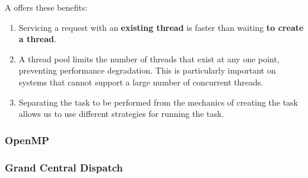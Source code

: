 A  offers these benefits:
\begin{enumerate}[noitemsep]
\item Servicing a request with an \textbf{existing thread} is faster than waiting \textbf{to create a thread}.
\item A thread pool limits the number of threads that exist at any one point, preventing performance degradation.
  This is particularly important on systems that cannot support a large number of concurrent threads.
\item Separating the task to be performed from the mechanics of creating the task allows us to use different strategies for running the task.
\end{enumerate}

\subsubsection{OpenMP}\label{subsubsec:OpenMP}
\subsubsection{Grand Central Dispatch}\label{subsubsec:Grand_Central_Dispatch}
